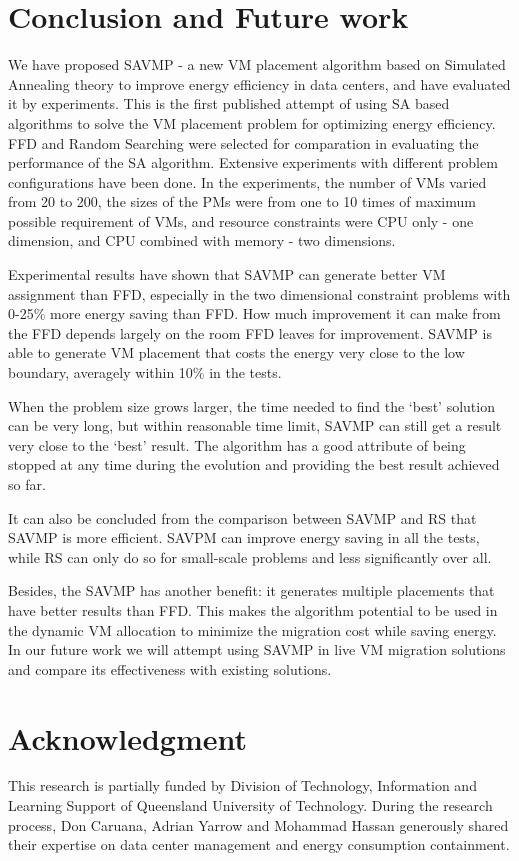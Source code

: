 \documentclass[10pt, conference, compsocconf]{IEEEtran}
\begin{document}
\section{Conclusion and Future work}

We have proposed SAVMP - a new VM placement algorithm based on Simulated
Annealing theory to improve energy efficiency in data centers, and have
evaluated it by experiments.
This is the first published attempt of using SA based algorithms to solve the VM placement problem for
optimizing energy efficiency. FFD
and Random Searching were selected for comparation in evaluating the
performance of the SA algorithm.
Extensive experiments with different problem configurations have been done.
In the experiments, the number of VMs varied from 20 to 200, the sizes of the
PMs were from one to 10 times of maximum possible requirement of VMs, and resource constraints were CPU
only - one dimension, and CPU combined with memory - two dimensions.

Experimental results have shown that SAVMP can generate better VM assignment
than FFD, especially in the two dimensional constraint problems with 0-25\% more energy
saving than FFD. How much improvement it can make from the FFD depends largely
on the room FFD leaves for improvement. SAVMP is able to generate VM placement
that costs the energy very close to the low boundary, averagely within 10\% in
the tests.

When the problem size grows larger, the time needed to find the `best' solution
can be very long, but within reasonable time limit, SAVMP can still get a result
very close to the `best' result. The algorithm has a good attribute of being stopped
at any time during the evolution and providing the best result achieved so far.

It can also be concluded from the comparison between SAVMP and RS that SAVMP is
 more efficient. SAVPM can improve energy saving in all the tests, while RS
can only do so for small-scale problems and less significantly over all.

Besides, the SAVMP has another benefit:
it generates multiple placements that have better results than FFD.
This makes the algorithm potential to be used in the dynamic VM allocation to
minimize the migration cost while saving energy. In our future work we will
attempt using SAVMP in live VM migration solutions and compare its effectiveness
with existing solutions.

\section*{Acknowledgment}
This research is partially funded by Division of Technology, Information and
Learning Support of Queensland University of Technology.
During the research process, Don Caruana, Adrian Yarrow and Mohammad Hassan 
generously shared their expertise on data center management and 
energy consumption containment.




\end{document}
